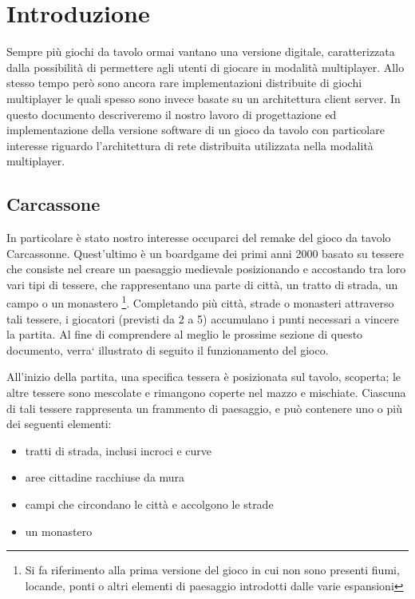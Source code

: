 \section{Introduzione}
Sempre più giochi da tavolo ormai vantano una versione digitale,
caratterizzata dalla possibilità di permettere agli utenti di giocare in
modalità multiplayer.
Allo stesso tempo però sono ancora rare implementazioni distribuite di
giochi multiplayer le quali spesso sono invece basate su un architettura
client server. In questo documento descriveremo il nostro lavoro di
progettazione ed implementazione della versione software di un gioco da
tavolo con particolare interesse riguardo l'architettura di rete
distribuita utilizzata nella modalità multiplayer.

\subsection{Carcassone}
In particolare è stato nostro interesse occuparci del remake del gioco
da tavolo Carcassonne. Quest'ultimo è un boardgame dei
primi anni 2000 basato su tessere che consiste nel creare un paesaggio medievale 
posizionando e accostando tra loro vari tipi di tessere, che rappresentano una parte di città, 
un tratto di strada, un campo o un monastero \footnote{Si fa riferimento
alla prima versione del gioco in cui non sono presenti fiumi, locande, ponti o altri elementi di paesaggio introdotti dalle varie espansioni}.
Completando più città, strade o monasteri attraverso tali tessere, i
giocatori (previsti da 2 a 5) accumulano i punti necessari a vincere la partita.
Al fine di comprendere al meglio le prossime sezione di questo documento, 
verra` illustrato di seguito il funzionamento del gioco.

All'inizio della partita, una specifica tessera è posizionata sul tavolo, scoperta; 
le altre tessere sono mescolate e rimangono coperte nel mazzo e mischiate.
Ciascuna di tali tessere rappresenta un frammento di paesaggio, e può contenere uno o più dei seguenti elementi:

\begin{itemize}
	\item tratti di strada, inclusi incroci e curve
    \item aree cittadine racchiuse da mura
    \item campi che circondano le città e accolgono le strade
    \item un monastero
\end{itemize}


